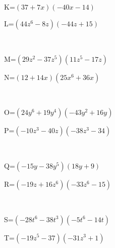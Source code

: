 \documentclass{article}%
\begin{document}
\\%
\begin{minipage}{0.5\textwidth}%
K=$(37+7x)(-40x-14)$\\%
\end{minipage}%
\begin{minipage}{0.5\textwidth}%
L=$(44z^6-8z)(-44z+15)$\\%
\end{minipage}%
\\%
\begin{minipage}{0.5\textwidth}%
M=$(29z^2-37z^5)(11z^5-17z)$\\%
\end{minipage}%
\begin{minipage}{0.5\textwidth}%
N=$(12+14x)(25x^6+36x)$\\%
\end{minipage}%
\\%
\begin{minipage}{0.5\textwidth}%
O=$(24y^6+19y^4)(-43y^2+16y)$\\%
\end{minipage}%
\begin{minipage}{0.5\textwidth}%
P=$(-10z^3-40z)(-38z^3-34)$\\%
\end{minipage}%
\\%
\begin{minipage}{0.5\textwidth}%
Q=$(-15y-38y^5)(18y+9)$\\%
\end{minipage}%
\begin{minipage}{0.5\textwidth}%
R=$(-19z+16z^6)(-33z^6-15)$\\%
\end{minipage}%
\\%
\begin{minipage}{0.5\textwidth}%
S=$(-28t^6-38t^3)(-5t^6-14t)$\\%
\end{minipage}%
\begin{minipage}{0.5\textwidth}%
T=$(-19z^5-37)(-31z^3+1)$\\%
\end{minipage}%
\\

%
\newpage%
\end{document}
